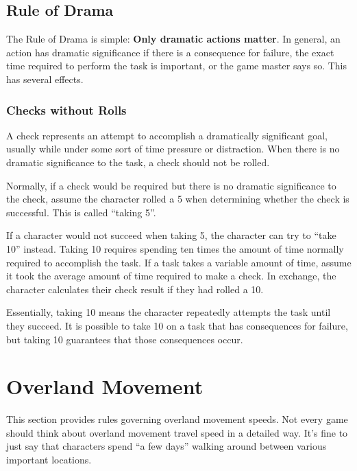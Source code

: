   \subsection{Rule of Drama}

    The Rule of Drama is simple: \textbf{Only dramatic actions matter}.
    In general, an action has dramatic significance if there is a consequence for failure, the exact time required to perform the task is important, or the game master says so.
    This has several effects.

    \subsubsection{Checks without Rolls}
      A check represents an attempt to accomplish a dramatically significant goal, usually while under some sort of time pressure or distraction.
      When there is no dramatic significance to the task, a check should not be rolled.

      Normally, if a check would be required but there is no dramatic significance to the check, assume the character rolled a 5 when determining whether the check is successful.
      This is called ``taking 5''.

      If a character would not succeed when taking 5, the character can try to ``take 10'' instead.
      Taking 10 requires spending ten times the amount of time normally required to accomplish the task.
      If a task takes a variable amount of time, assume it took the average amount of time required to make a check.
      In exchange, the character calculates their check result if they had rolled a 10.

      Essentially, taking 10 means the character repeatedly attempts the task until they succeed.
      It is possible to take 10 on a task that has consequences for failure, but taking 10 guarantees that those consequences occur.

\section{Overland Movement}\label{Overland Movement}

  This section provides rules governing overland movement speeds.
  Not every game should think about overland movement travel speed in a detailed way.
  It's fine to just say that characters spend ``a few days'' walking around between various important locations.


